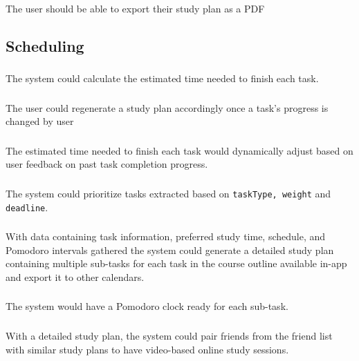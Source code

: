 \documentclass[12pt]{article}
\begin{document}
\subsubsection{}
The user should be able to export their study plan as a PDF


\subsection{Scheduling}

\subsubsection{}
The system could calculate the estimated time needed to finish each task. 
\subsubsection{}
The user could regenerate a study plan accordingly once a task's progress is changed by user
\subsubsection{}
The estimated time needed to finish each task would dynamically adjust based on user feedback on past task completion progress.
\subsubsection{}
The system could prioritize tasks extracted based on \texttt{taskType, weight} and \texttt{deadline}.
\subsubsection{}
With data containing task information, preferred study time, schedule, and Pomodoro intervals gathered the system could generate a detailed study plan containing multiple sub-tasks for each task in the course outline available in-app and export it to other calendars.
\subsubsection{}
The system would have a Pomodoro clock ready for each sub-task.
\subsubsection{}
With a detailed study plan, the system could pair friends from the friend list with similar study plans to have video-based online study sessions.
\end{document}

